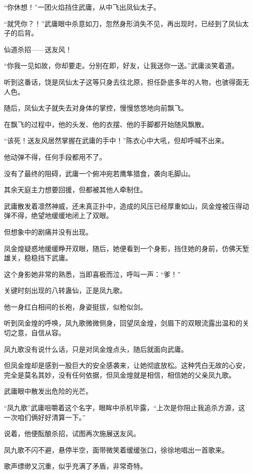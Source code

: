 \begin{this_body}
“你休想！”一团火焰挡住武庸，从中飞出凤仙太子。

“就凭你？！”武庸眼中杀意如刀，忽然身形消失不见，再出现时，已经到了凤仙太子的后背。

仙道杀招——送友风！

“你我一见如故，你却要走。分别在即，好友，让我送你一送。”武庸淡笑着道。

听到这番话，饶是凤仙太子这等只身去往北原，担任卧底多年的人物，也骇得面无人色。

随后，凤仙太子就失去对身体的掌控，慢慢悠悠地向前飘飞。

在飘飞的过程中，他的头发、他的衣摆、他的手脚都开始随风飘散。

“该死！送友风居然掌握在武庸的手中！”陈衣心中大吼，但却呼喊不出来。

他动弹不得，任何手段都用不了。

没有了最终的阻碍，武庸一个俯冲宛若鹰隼猎食，袭向毛脚山。

其余天庭主力想要回援，但都被其他人牵制住。

武庸散发着凛然神威，还未真正扑中，造成的风压已经厚重如山，凤金煌被压得动弹不得，绝望地缓缓地闭上了双眼。

但想象中的剧痛并没有出现。

凤金煌疑惑地缓缓睁开双眼，随后，她便看到一个身影，挡住她的身前，仿佛天堑雄关，稳稳挡下武庸。

这个身影她非常的熟悉，当即喜极而泣，呼叫一声：“爹！”

关键时刻出现的八转蛊仙，正是凤九歌。

他一身红白相间的长袍，身姿挺拔，似枪似剑。

听到凤金煌的呼唤，凤九歌微微侧身，回望凤金煌，剑眉下的双眼流露出温和的关切之意，自信从容。

凤九歌没有说什么话，只是对凤金煌点头，随后就面向武庸。

但凤金煌却是感到一股巨大的安全感袭来，让她彻底放松。这种凭白无故的心安，完全是莫名其妙，没有任何依据，但凤金煌就是相信，相信她的父亲凤九歌。

武庸眼中散发出危险的光芒。

“凤九歌”武庸咀嚼着这个名字，眼眸中杀机毕露，“上次是你阻止我追杀方源，这一次咱们俩好好清算一下。”

说着，他便酝酿杀招，试图再次施展送友风。

凤九歌不闪不避，悬停半空，面带微笑着缓缓张口，徐徐地唱出一首歌来。

歌声缥缈又沉重，似乎充满了矛盾，非常奇特。


\end{this_body}
